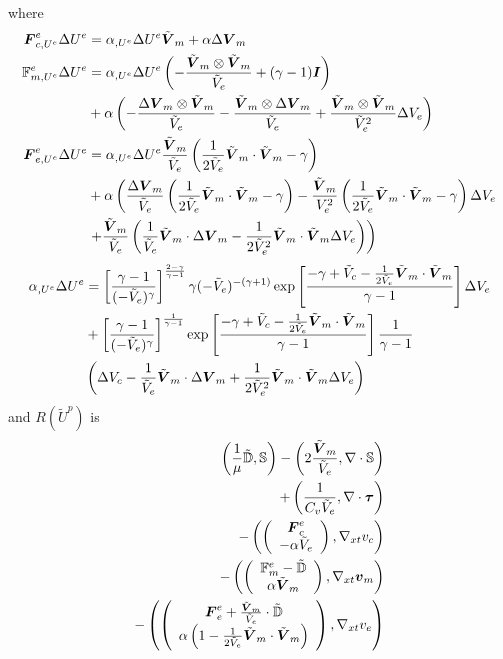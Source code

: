 \documentclass{article}
\begin{document}
where
\begin{align*}
\boldsymbol F^e_{c,U^e}\Delta U^e&=\alpha_{,U^e}\Delta U^e\tilde{\boldsymbol V}_m+\alpha\Delta\boldsymbol V_m\\
\mathbb{F}^e_{m,U^e}\Delta U^e&=
\alpha_{,U^e}\Delta U^e\left( -\frac{\tilde{\boldsymbol V}_m\otimes\tilde{\boldsymbol V}_m}{\tilde V_e}+(\gamma-1)\boldsymbol I \right)\\
&+\alpha\left( 
-\frac{\Delta\boldsymbol V_m\otimes\tilde{\boldsymbol V}_m}{\tilde V_e}
-\frac{\tilde{\boldsymbol V}_m\otimes\Delta\boldsymbol V_m}{\tilde V_e}
+\frac{\tilde{\boldsymbol V}_m\otimes\tilde{\boldsymbol V}_m}{\tilde V_e^2}\Delta V_e
 \right)\\
\boldsymbol F^e_{e,U^e}\Delta U^e&=
\alpha_{,U^e}\Delta U^e\frac{\tilde{\boldsymbol V}_m}{\tilde V_e}\left( \frac{1}{2\tilde V_e}\tilde{\boldsymbol V}_m\cdot\tilde{\boldsymbol V}_m-\gamma \right)\\
&+\alpha\left( 
\frac{\Delta\boldsymbol V_m}{\tilde V_e}\left( \frac{1}{2\tilde V_e}\tilde{\boldsymbol V}_m\cdot\tilde{\boldsymbol V}_m-\gamma \right)
-\frac{\tilde{\boldsymbol V}_m}{V_e^2}\left( \frac{1}{2\tilde V_e}\tilde{\boldsymbol V}_m\cdot\tilde{\boldsymbol V}_m-\gamma \right)\Delta V_e\right.\\
&\left.
+\frac{\tilde{\boldsymbol V}_m}{\tilde V_e}\left( 
\frac{1}{\tilde V_e}\tilde{\boldsymbol V}_m\cdot\Delta\boldsymbol V_m
-\frac{1}{2\tilde V_e^2}\tilde{\boldsymbol V}_m\cdot\tilde{\boldsymbol V}_m\Delta V_e
 \right)
 \right)\\
\end{align*}
\begin{align*}
\alpha_{,U^e}\Delta U^e&=
\left[ \frac{\gamma-1}{(-\tilde V_e)^\gamma} \right]^{\frac{2-\gamma}{\gamma-1}}
\gamma(-\tilde V_e)^{-(\gamma+1)}
\exp\left[ \frac{-\gamma+\tilde V_c-\frac{1}{2\tilde V_e}\tilde{\boldsymbol V}_m\cdot\tilde{\boldsymbol V}_m}{\gamma-1} \right]
\Delta V_e\\
&+\left[ \frac{\gamma-1}{(-\tilde V_e)^\gamma} \right]^{\frac{1}{\gamma-1}}
\exp\left[ \frac{-\gamma+\tilde V_c-\frac{1}{2\tilde V_e}\tilde{\boldsymbol V}_m\cdot\tilde{\boldsymbol V}_m}{\gamma-1} \right]
\frac{1}{\gamma-1}\\
&\left( \Delta V_c
-\frac{1}{\tilde V_e}\tilde{\boldsymbol V}_m\cdot\Delta\boldsymbol V_m
+\frac{1}{2\tilde V_e^2}\tilde{\boldsymbol V}_m\cdot\tilde{\boldsymbol V}_m\Delta V_e
 \right)
\end{align*}
and $R(\tilde U^p)$ is
\begin{align*}
	\left( \frac{1}{\mu}\tilde{\mathbb{D}},\mathbb{S} \right)-\left( 2\frac{\tilde{\boldsymbol V}_m}{\tilde V_e},\nabla\cdot\mathbb{S} \right)\\
	+\left( \frac{1}{C_v\tilde V_e},\nabla\cdot\boldsymbol\tau \right)\\
	-\left( \left( \begin{array}{c} \boldsymbol F^e_c\\ -\alpha\tilde V_e\\ \end{array} \right),\nabla_{xt} v_c \right)\\
	-\left( \left( \begin{array}{c} \mathbb{F}^e_m-\tilde{\mathbb{D}}\\ \alpha\tilde{\boldsymbol V}_m\\ \end{array} \right),\nabla_{xt}\boldsymbol v_m \right)\\
	-\left( \left( \begin{array}{c} \boldsymbol F^e_e+\frac{\tilde{\boldsymbol V}_m}{\tilde V_e}\cdot\tilde{\mathbb{D}}\\ \alpha\left( 1-\frac{1}{2\tilde V_e}\tilde{\boldsymbol V}_m\cdot\tilde{\boldsymbol V}_m \right)\\ \end{array} \right),\nabla_{xt} v_e \right)
\end{align*}
\end{document}
